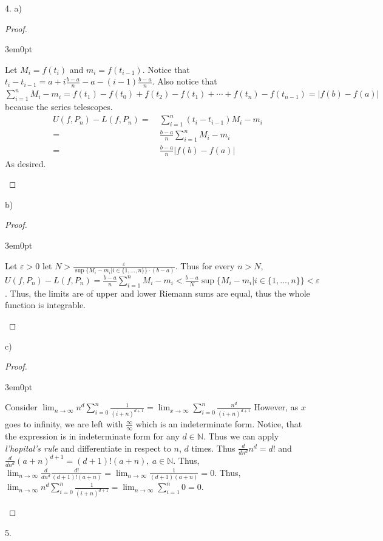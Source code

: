 \documentclass[11pt]{article}
\newcommand{\N}{\mathbb{N}}
\newenvironment{myproof}
{\begin{proof} \begin{adjustwidth}{3em}{0pt}$ $\par\nobreak\ignorespaces}
{\end{adjustwidth} \end{proof}}
\begin{document}
\begin{flushleft}
\newpage

4. a)

\begin{myproof}
Let $M_i = f(t_i)$ and $m_i=f(t_{i-1})$. Notice that $t_i - t_{i-1} = a + i\frac{b-a}{n} - a - (i-1)\frac{b-a}{n}$. Also notice that $\sum_{i=1}^n M_i - m_i = f(t_1) - f(t_0) + f(t_2) - f(t_1) + \cdots + f(t_n) - f(t_{n-1}) = |f(b)-f(a)|$ because the series telescopes.
\begin{align*}
U(f,P_n) - L(f,P_n) = & \ \sum_{i=1}^n(t_i - t_{i-1})M_i-m_i \\
= & \ \frac{b-a}{n} \sum_{i=1}^n M_i - m_i \\
= & \ \frac{b-a}{n}|f(b) - f(a)|
\end{align*}
As desired.
\end{myproof}

b)

\begin{myproof}
Let $\varepsilon > 0$ let $N > \frac{\varepsilon}{\sup \{M_i - m_i| i \in \{1,...,n\} \} \cdot (b-a)}$. Thus for every $n > N$, $U(f,P_n) - L(f,P_n) = \frac{b-a}{n}\sum_{i=1}^nM_i - m_i < \frac{b-a}{N}\sup \{M_i - m_i| i \in \{1,...,n\} \} < \varepsilon$. Thus, the limits are of upper and lower Riemann sums are equal, thus the whole function is integrable.
\end{myproof}

c)
\begin{myproof}
Consider $\lim_{n \to \infty} n^d \sum_{i=0}^n \frac{1}{(i+n)^{d+1}} = \lim_{x \to \infty} \sum_{i=0}^n \frac{n^d}{(i+n)^{d+1}} $ However, as $x$ goes to infinity, we are left with $\frac{\infty}{\infty}$ which is an indeterminate form. Notice, that the expression is in indeterminate form for any $d \in \N$. Thus we can apply \textit{l'hopital's rule} and differentiate in respect to $n$, $d$ times. Thus $\frac{d}{dn^d} n^d=d!$ and $\frac{d}{dn^d} (a + n)^{d+1} = (d+1)!(a+n), \ a \in \N$. Thus, $\lim_{n \to \infty} \frac{d}{dn^d} \frac{d!}{(d+1)!(a+n)}= \lim_{n \to \infty} \frac{1}{(d+1)(a+n)} =0$. Thus, $\lim_{n \to \infty}  n^d \sum_{i=0}^n \frac{1}{(i+n)^{d+1}} = \lim_{n \to \infty} \sum_{i=1}^n 0 = 0$.
\end{myproof}

\newpage

5.


\end{flushleft}
\end{document}
